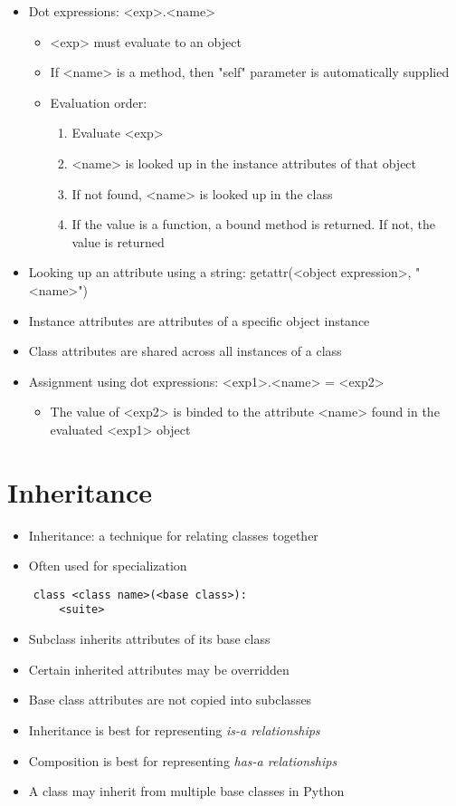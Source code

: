 \begin{itemize}
    \item Dot expressions: <exp>.<name>
    \begin{itemize}
        \item <exp> must evaluate to an object
        \item If <name> is a method, then "self" parameter is automatically supplied
        \item Evaluation order:
        \begin{enumerate}
            \item Evaluate <exp>
            \item <name> is looked up in the instance attributes of that object
            \item If not found, <name> is looked up in the class
            \item If the value is a function, a bound method is returned. If not, the value is returned
        \end{enumerate}
    \end{itemize}
    \item Looking up an attribute using a string: getattr(<object expression>, "<name>")
    \item Instance attributes are attributes of a specific object instance
    \item Class attributes are shared across all instances of a class
    \item Assignment using dot expressions: <exp1>.<name> = <exp2>
    \begin{itemize}
        \item The value of <exp2> is binded to the attribute <name> found in the evaluated <exp1> object
    \end{itemize}
\end{itemize}

\section{Inheritance}
\begin{itemize}
    \item Inheritance: a technique for relating classes together
    \item Often used for specialization
\end{itemize}
\begin{verbatim}
    class <class name>(<base class>):
        <suite>
\end{verbatim}
\begin{itemize}
    \item Subclass inherits attributes of its base class
    \item Certain inherited attributes may be overridden
    \item Base class attributes are not copied into subclasses
    \item Inheritance is best for representing \emph{is-a relationships}
    \item Composition is best for representing \emph{has-a relationships}
    \item A class may inherit from multiple base classes in Python
\end{itemize}

